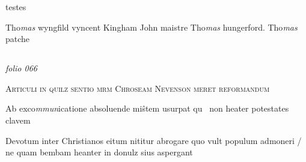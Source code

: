 \documentclass[12pt, a4paper]{book}
\begin{document}
	
		\ifthenelse{\isodd{\thepage}}
		{\reversemarginpar}
		{\normalmarginpar}
		testes
	
		\ifthenelse{\isodd{\thepage}}
		{\reversemarginpar}
		{\normalmarginpar}
		Tho\textit{mas} wyngfild vyncent Kingham John maistre
		Tho\textit{mas }hungerford. Tho\textit{mas} patche



            
            
\dotfill
					  \subsection*{}  \subsection*{}  \subsection*{}

\textit{folio 066}


 	
 		
				\begin{center} \begin{large} {\scshape Articuli in quilz sentio mrm Chroseam Nevenson meret reformandum } \end{large} \end{center}
			
		
				\marginpar[\vspace{0.5cm}{\textcolor{Gray}{Orphen}}]{}
			
 		
 			
			
 			
		\ifthenelse{\isodd{\thepage}}
		{\reversemarginpar}
		{\normalmarginpar}
		Ab exco\textit{mmun}icatione absoluende mi\^stem usurpat qu  non heater potestates clavem
 		
 		
 			
				\marginpar[\vspace{0.5cm}{\textcolor{Gray}{2}}]{}
			
 			
		\ifthenelse{\isodd{\thepage}}
		{\reversemarginpar}
		{\normalmarginpar}
		Devotum inter Christianos eitum nititur abrogare  quo vult populum admoneri / ne quam bembam heanter in donulz sius aspergant
 		
\end{document}
